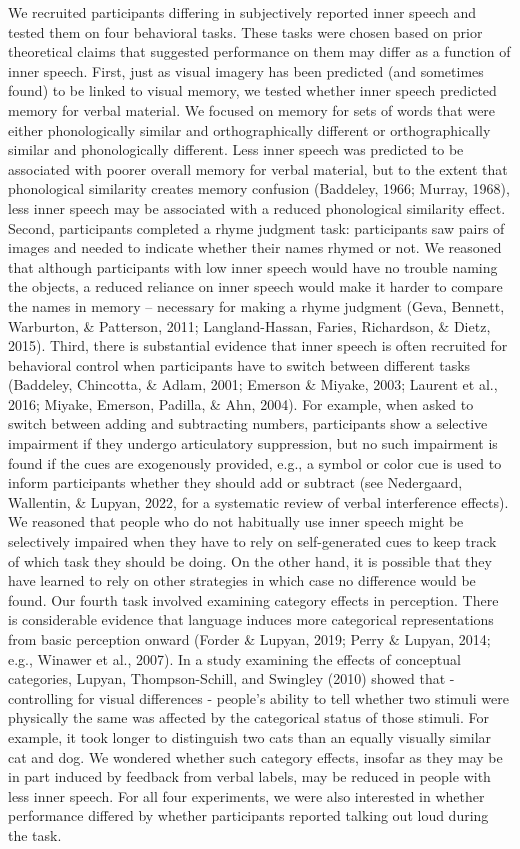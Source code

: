 \documentclass[
  man,a4paper,floatsintext]{apa6}
\begin{document}
We recruited participants differing in subjectively reported inner speech and tested them on four behavioral tasks. These tasks were chosen based on prior theoretical claims that suggested performance on them may differ as a function of inner speech. First, just as visual imagery has been predicted (and sometimes found) to be linked to visual memory, we tested whether inner speech predicted memory for verbal material. We focused on memory for sets of words that were either phonologically similar and orthographically different or orthographically similar and phonologically different. Less inner speech was predicted to be associated with poorer overall memory for verbal material, but to the extent that phonological similarity creates memory confusion (Baddeley, 1966; Murray, 1968), less inner speech may be associated with a reduced phonological similarity effect. Second, participants completed a rhyme judgment task: participants saw pairs of images and needed to indicate whether their names rhymed or not. We reasoned that although participants with low inner speech would have no trouble naming the objects, a reduced reliance on inner speech would make it harder to compare the names in memory -- necessary for making a rhyme judgment (Geva, Bennett, Warburton, \& Patterson, 2011; Langland-Hassan, Faries, Richardson, \& Dietz, 2015). Third, there is substantial evidence that inner speech is often recruited for behavioral control when participants have to switch between different tasks (Baddeley, Chincotta, \& Adlam, 2001; Emerson \& Miyake, 2003; Laurent et al., 2016; Miyake, Emerson, Padilla, \& Ahn, 2004). For example, when asked to switch between adding and subtracting numbers, participants show a selective impairment if they undergo articulatory suppression, but no such impairment is found if the cues are exogenously provided, e.g., a symbol or color cue is used to inform participants whether they should add or subtract (see Nedergaard, Wallentin, \& Lupyan, 2022, for a systematic review of verbal interference effects). We reasoned that people who do not habitually use inner speech might be selectively impaired when they have to rely on self-generated cues to keep track of which task they should be doing. On the other hand, it is possible that they have learned to rely on other strategies in which case no difference would be found. Our fourth task involved examining category effects in perception. There is considerable evidence that language induces more categorical representations from basic perception onward (Forder \& Lupyan, 2019; Perry \& Lupyan, 2014; e.g., Winawer et al., 2007). In a study examining the effects of conceptual categories, Lupyan, Thompson-Schill, and Swingley (2010) showed that - controlling for visual differences - people's ability to tell whether two stimuli were physically the same was affected by the categorical status of those stimuli. For example, it took longer to distinguish two cats than an equally visually similar cat and dog. We wondered whether such category effects, insofar as they may be in part induced by feedback from verbal labels, may be reduced in people with less inner speech. For all four experiments, we were also interested in whether performance differed by whether participants reported talking out loud during the task.
\end{document}

